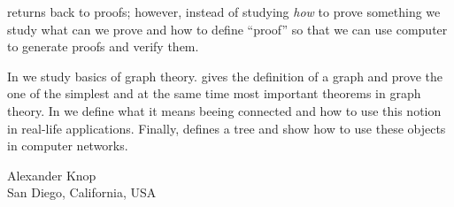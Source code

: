  returns back to proofs; however, instead of studying \emph{how}
to prove something we study what can we prove and how to define ``proof''
so that we can use computer to generate proofs and verify them.

In  we study basics of graph theory.
 gives the definition of a graph and prove
the one of the simplest and at the same time most important theorems in graph
theory. In  we define what it means beeing connected and
how to use this notion in real-life applications. Finally, 
defines a tree and show how to use these objects in computer networks.

\begin{flushright}
  Alexander Knop \\
  San Diego, California, USA
\end{flushright}
